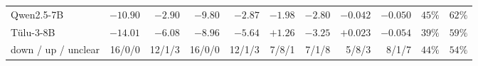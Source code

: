 \begin{table}[tb]
\begin{tabular}{lrrrrrrrrrr}
Qwen2.5-7B & $\mathbf{-10.90}$ & $\mathbf{-2.90}$ & $\mathbf{-9.80}$ & $\mathbf{-2.87}$ & $\mathbf{-1.98}$ & $\mathbf{-2.80}$ & $\mathbf{-0.042}$ & $\mathbf{-0.050}$ & $45\%$ & $62\%$ \\
T\"ulu-3-8B & $\mathbf{-14.01}$ & $\mathbf{-6.08}$ & $\mathbf{-8.96}$ & $\mathbf{-5.64}$ & $\mathbf{+1.26}$ & $\mathbf{-3.25}$ & $\mathbf{+0.023}$ & $\mathbf{-0.054}$ & $39\%$ & $59\%$ \\
\midrule down / up / unclear & 16/0/0 & 12/1/3 & 16/0/0 & 12/1/3 & 7/8/1 & 7/1/8 & 5/8/3 & 8/1/7 & $44\%$ & $54\%$ \\
\bottomrule\end{tabular}
\end{table}
